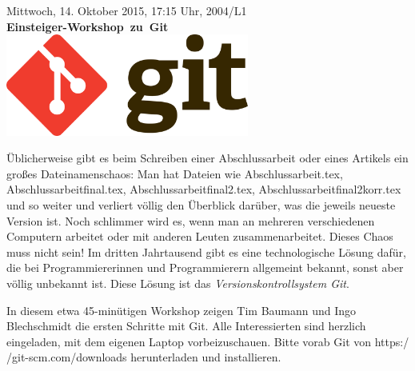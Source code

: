 \documentclass[a4paper,ngerman,landscape]{scrartcl}
\begin{document}
\begin{center}
  \Huge
  \vspace*{0.0em}
  Mittwoch, 14. Oktober 2015, 17:15 Uhr, 2004/L1 \\
  \mbox{\textbf{Einsteiger-Workshop zu Git}}
  \vfill
  \vspace{0.3em}
  \includegraphics[width=0.6\textwidth]{git-logo}
  \vfill

  \Large
  \begin{minipage}{0.92\textwidth}
    \setlength\parskip{\medskipamount}
    \vspace{0.3em}
    Üblicherweise gibt es beim Schreiben einer Abschlussarbeit oder eines
    Artikels ein großes Dateinamenschaos: Man hat Dateien wie
    Abschlussarbeit.tex, Abschlussarbeitfinal.tex, Abschlussarbeitfinal2.tex,
    Abschlussarbeitfinal2korr.tex und so weiter und verliert völlig den
    Überblick darüber, was die jeweils neueste Version ist. Noch schlimmer wird
    es, wenn man an mehreren verschiedenen Computern arbeitet oder mit anderen
    Leuten zusammenarbeitet. Dieses Chaos muss nicht sein! Im dritten
    Jahrtausend gibt es eine technologische Lösung dafür, die bei
    Programmiererinnen und Programmierern allgemeint bekannt, sonst aber völlig
    unbekannt ist. Diese Lösung ist das \emph{Versionskontrollsystem Git}.

    In diesem etwa 45-minütigen Workshop zeigen Tim Baumann und Ingo
    Blechschmidt die ersten Schritte mit Git. Alle Interessierten sind herzlich
    eingeladen, mit dem eigenen Laptop vorbeizuschauen. Bitte vorab Git von
    \textsf{https:/$\!$/git-scm.com/downloads} herunterladen und installieren.
  \end{minipage}
\end{center}
\end{document}
